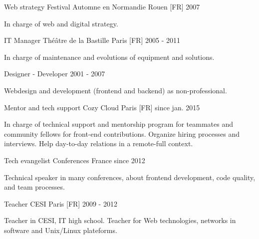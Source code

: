 \begin{cventries}
  \cventry
    {Web strategy}
    {Festival Automne en Normandie}
    {Rouen [FR]}
    {2007}
    {
      \begin{cvitems}
        \item{In charge of web and digital strategy.}
      \end{cvitems}
    }
  \vspace{\msetCventryBottomSkip}

  \cventry
    {IT Manager}
    {Théâtre de la Bastille}
    {Paris [FR]}
    {2005 - 2011}
    {
      \begin{cvitems}
        \item{In charge of maintenance and evolutions of equipment and solutions.}
      \end{cvitems}
    }
  \vspace{\msetCventryBottomSkip}

  \cventry
    {Designer - Developer}
    {}
    {}
    {2001 - 2007}
    {
      \begin{cvitems}
        \item{Webdesign and development (frontend and backend) as non-professional.}
      \end{cvitems}
    }

\end{cventries}


\vspace{-3mm}

\begin{cventries}

  \cventry
    {Mentor and tech support}
    {Cozy Cloud}
    {Paris [FR]}
    {since jan. 2015}
    {
      \begin{cvitems}
        \item{In charge of technical support and mentorship program for teammates and community fellows for front-end contributions. Organize hiring processes and interviews. Help day-to-day relations in a remote-full context.}
      \end{cvitems}
    }
  \vspace{\msetCventryBottomSkip}

  \cventry
    {Tech evangelist}
    {Conferences}
    {France}
    {since 2012}
    {
      \begin{cvitems}
        \item{Technical speaker in many conferences, about frontend development, code quality, and team processes.}
      \end{cvitems}
    }
  \vspace{\msetCventryBottomSkip}

  \cventry
    {Teacher}
    {CESI}
    {Paris [FR]}
    {2009 - 2012}
    {
      \begin{cvitems}
        \item{Teacher in CESI, IT high school. Teacher for Web technologies, networks in software and Unix/Linux plateforms.}
      \end{cvitems}
    }

\end{cventries}
